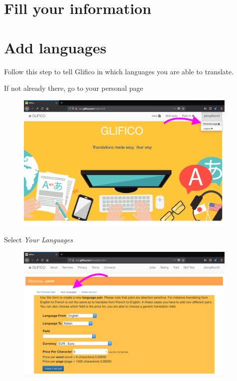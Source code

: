 \documentclass[11 pt, a4paper]{article}
\begin{document}
\clearpage
\section{Fill your information}


\clearpage
\section{Add languages}
Follow this step to tell Glifico in which languages you are able to translate.

If not already there, go to your personal page
\begin{figure}[H]
\centering
\includegraphics[width=0.95\textwidth]{translator_pair0.png}
\end{figure}

Select \textit{Your Languages}
\begin{figure}[H]
\centering
\includegraphics[width=0.95\textwidth]{translator_pair1.png}
\end{figure}
\end{document}
